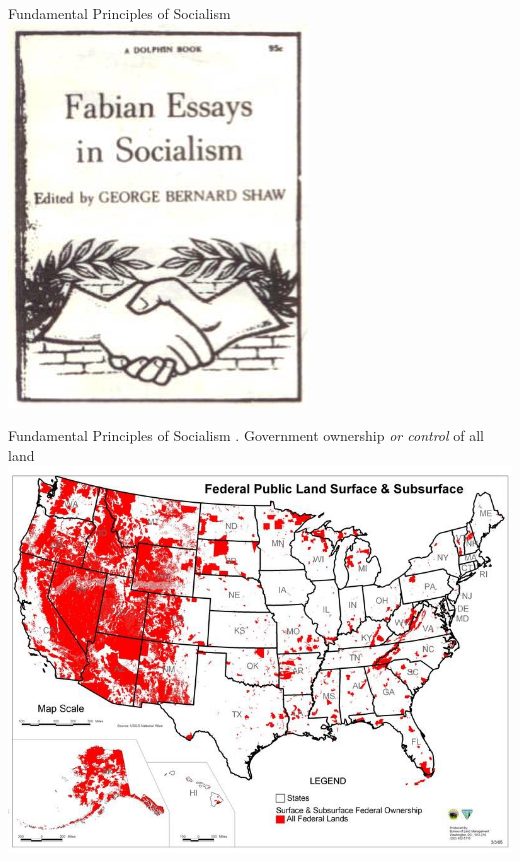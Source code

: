 \begin{frame}{Fundamental Principles of Socialism}
    \centering
    \includegraphics[height=.9\textheight]{img/fabian.png} \\
\end{frame}

\begin{frame}{Fundamental Principles of Socialism}
    . Government ownership \emph{or control} of all land \\
    \includegraphics[height=.9\textheight]{img/federal-lands.png} \\
\end{frame}

